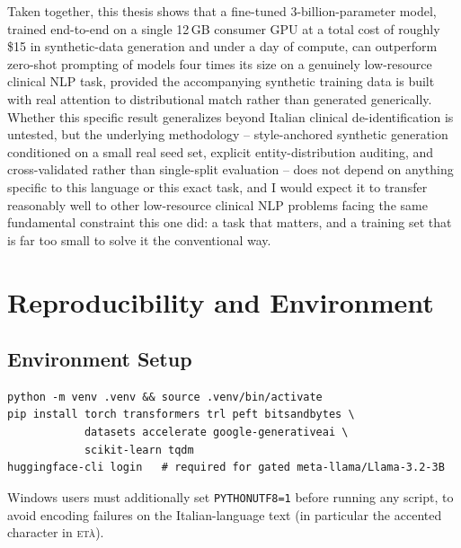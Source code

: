 \documentclass[12pt,a4paper]{report}
\newcommand{\ETA}{\textsc{et\`a}}
\begin{document}
Taken together, this thesis shows that a fine-tuned 3-billion-parameter model, trained end-to-end on a single 12\,GB consumer GPU at a total cost of roughly \$15 in synthetic-data generation and under a day of compute, can outperform zero-shot prompting of models four times its size on a genuinely low-resource clinical NLP task, provided the accompanying synthetic training data is built with real attention to distributional match rather than generated generically. Whether this specific result generalizes beyond Italian clinical de-identification is untested, but the underlying methodology -- style-anchored synthetic generation conditioned on a small real seed set, explicit entity-distribution auditing, and cross-validated rather than single-split evaluation -- does not depend on anything specific to this language or this exact task, and I would expect it to transfer reasonably well to other low-resource clinical NLP problems facing the same fundamental constraint this one did: a task that matters, and a training set that is far too small to solve it the conventional way.




\appendix

\chapter{Reproducibility and Environment}
\label{app:repro}

\section{Environment Setup}

\begin{lstlisting}
python -m venv .venv && source .venv/bin/activate
pip install torch transformers trl peft bitsandbytes \
            datasets accelerate google-generativeai \
            scikit-learn tqdm
huggingface-cli login   # required for gated meta-llama/Llama-3.2-3B
\end{lstlisting}

Windows users must additionally set \texttt{PYTHONUTF8=1} before running any script, to avoid encoding failures on the Italian-language text (in particular the accented character in \ETA{}).
\end{document}
